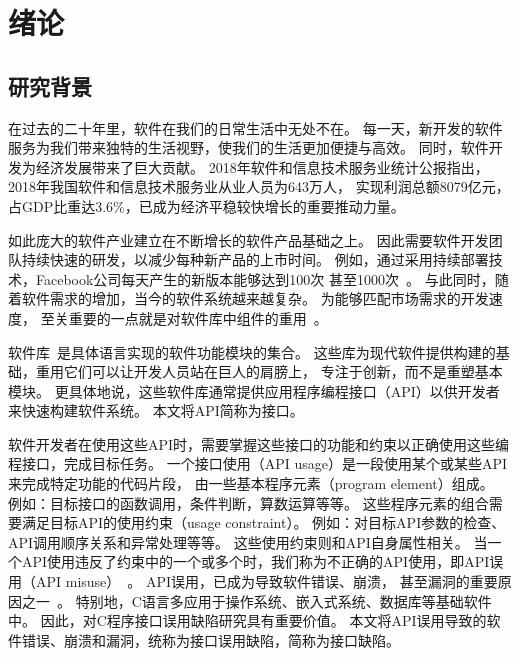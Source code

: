 \chapter{绪论}
\label{cha:intro}

\section{研究背景}
在过去的二十年里，软件在我们的日常生活中无处不在。
每一天，新开发的软件服务为我们带来独特的生活视野，使我们的生活更加便捷与高效。
同时，软件开发为经济发展带来了巨大贡献。
2018年软件和信息技术服务业统计公报指出，
2018年我国软件和信息技术服务业从业人员为643万人，
实现利润总额8079亿元，占GDP比重达3.6\%，已成为经济平稳较快增长的重要推动力量\cite{2018-china-report}。


如此庞大的软件产业建立在不断增长的软件产品基础之上。
因此需要软件开发团队持续快速的研发，以减少每种新产品的上市时间。
例如，通过采用持续部署技术，Facebook公司每天产生的新版本能够达到100次
甚至1000次~\cite{16-icse-continuous}。
与此同时，随着软件需求的增加，当今的软件系统越来越复杂。
为能够匹配市场需求的开发速度，
至关重要的一点就是对软件库中组件的重用~\cite{2011-icsr-reuse, 2013-cbse-reuse}。

软件库~\cite{library}是具体语言实现的软件功能模块的集合。
这些库为现代软件提供构建的基础，重用它们可以让开发人员站在巨人的肩膀上，
专注于创新，而不是重塑基本模块。
更具体地说，这些软件库通常提供应用程序编程接口（API）以供开发者来快速构建软件系统。
本文将API简称为接口。


软件开发者在使用这些API时，需要掌握这些接口的功能和约束以正确使用这些编程接口，完成目标任务。
一个接口使用（API usage）是一段使用某个或某些API来完成特定功能的代码片段，
由一些基本程序元素（program element）组成。
例如：目标接口的函数调用，条件判断，算数运算等等。
这些程序元素的组合需要满足目标API的使用约束（usage constraint）。
例如：对目标API参数的检查、API调用顺序关系和异常处理等等。
这些使用约束则和API自身属性相关。
当一个API使用违反了约束中的一个或多个时，我们称为不正确的API使用，即API误用（API misuse）~\cite{16-msr-mubench}。
API误用，已成为导致软件错误、崩溃，
甚至漏洞的重要原因之一~\cite{12-ccs-android,12-ccs-ssl,13-ccs-misuse,13-tosem-missing-call,14-apsys-case,15-icpc-api,16-ase-spec}。
特别地，C语言多应用于操作系统、嵌入式系统、数据库等基础软件中。
因此，对C程序接口误用缺陷研究具有重要价值。
本文将API误用导致的软件错误、崩溃和漏洞，统称为接口误用缺陷，简称为接口缺陷。


